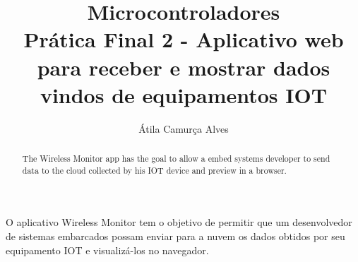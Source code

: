 \documentclass[a4paper,12pt]{article}
\title{Microcontroladores\\Prática Final 2 - Aplicativo web para receber e mostrar dados vindos de equipamentos IOT}
\author{Átila Camurça Alves}
\begin{document}
\maketitle

\begin{abstract}
  The Wireless Monitor app has the goal to allow a embed systems developer
  to send data to the cloud collected by his IOT device and preview in a
  browser.
\end{abstract}
     
\begin{resumo}
  O aplicativo Wireless Monitor tem o objetivo de permitir que um
  desenvolvedor de sistemas embarcados possam enviar para a nuvem
  os dados obtidos por seu equipamento IOT e visualizá-los no navegador.
\end{resumo}





\end{document}
